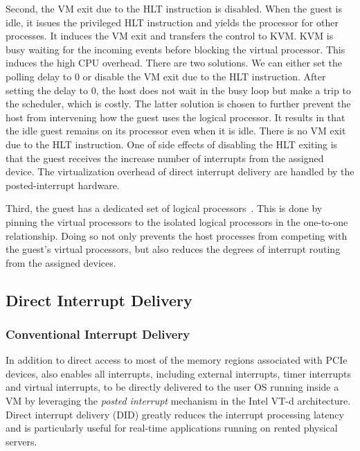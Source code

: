 {Second, the VM exit due to the HLT instruction is disabled.
When the guest is idle, it issues the privileged HLT
instruction and yields the processor for other processes. It
induces the VM exit and transfers the control to KVM. KVM is
busy waiting for the incoming events before blocking the
virtual processor. This induces the high CPU overhead. There
are two solutions. We can either set the polling delay to 0 or
disable the VM exit due to the HLT instruction. After setting
the delay to 0, the host does not wait in the busy loop but
make a trip to the scheduler, which is costly. The latter
solution is chosen to further prevent the host from
intervening how the guest uses the logical processor. It
results in that the idle guest remains on its processor even
when it is idle. There is no VM exit due to the HLT
instruction. One of side effects of disabling the HLT exiting
is that the guest receives the increase number of interrupts
from the assigned device. The virtualization overhead of
direct interrupt delivery are handled by the posted-interrupt
hardware.

Third, the guest has a dedicated set of logical
processors~\cite{amit:2015}. This is done by pinning the
virtual processors to the isolated logical processors in the
one-to-one relationship. Doing so not only prevents the host
processes from competing with the guest's virtual processors,
but also reduces the degrees of interrupt routing from the
assigned devices.
}


\subsection{Direct Interrupt Delivery}

\subsubsection{Conventional Interrupt Delivery}

In addition to direct access to most of the memory regions associated with PCIe devices,
\na also enables all interrupts, including external interrupts, timer interrupts and 
virtual interrupts, to be directly delivered to the user OS running inside a VM by leveraging
the {\em posted interrupt} mechanism in the Intel VT-d architecture.
Direct interrupt delivery (DID) greatly reduces the interrupt processing latency and is
particularly useful for real-time applications running on rented physical servers. 


